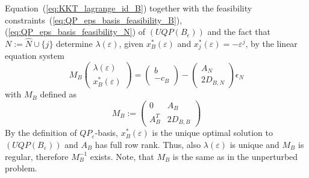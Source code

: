 \documentclass[a4paper]{article}
\begin{document}
Equation~(\ref{eq:KKT_lagrange_id_B}) together with the
feasibility constraints~(\ref{eq:QP_eps_basis_feasibility_B}),
(\ref{eq:QP_eps_basis_feasibility_N}) of
$(UQP(B_{\epsilon}))$ and the fact that $N:=\hat{N} \cup \{j\}$ determine
$\lambda(\varepsilon)$, given $x_{B}^{*}(\varepsilon)$ and
$x_{j}^{*}(\varepsilon) = -\varepsilon^{j}$, by the linear equation system
\begin{equation}
M_{B}\left(
        \begin{array}{c}
          \lambda(\varepsilon)  \\
          \hline
           x_{B}^{*}(\varepsilon)
        \end{array}
     \right)   
=
\left(
    \begin{array}{c}
        b \\
	\hline
	-c_{B}
     \end{array}
\right)
-
\left(
    \begin{array}{c}
        A_{N}  \\
	\hline
	2D_{B,N}
     \end{array}
\right)\epsilon_{N}
\end{equation}
with $M_{B}$ defined as
\begin{equation}
\label{def:M_B}
M_{B}:=\left(
           \begin{array}{c|c}
	       0 & A_{B} \\
	       \hline
	       A_{B}^{T} & 2D_{B,B}
	   \end{array}
	\right)
\end{equation}
By the definition of $QP_{\varepsilon}$-basis, $x_{B}^{*}(\varepsilon)$
is the unique optimal
solution to $(UQP(B_{\varepsilon}))$ and $A_{B}$ has full row rank. Thus, also
$\lambda(\varepsilon)$ is unique and $M_{B}$ is regular,
therefore $M_{B}^{-1}$ exists. Note,
that $M_{B}$ is the same as in the unperturbed problem.
 
\end{document}
